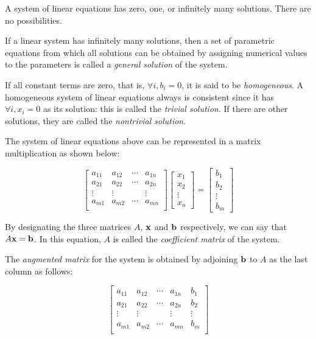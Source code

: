 \documentclass{report}
\begin{document}
		\begin{thm}
			A system of linear equations has zero, one, or infinitely many solutions. There are no possibilities.
		\end{thm}
		
		If a linear system has infinitely many solutions, then a set of parametric equations from which all solutions can be obtained by assigning numerical values to the parameters is called a \emph{general solution} of the system.
		
		If all constant terms are zero, that is, $\forall i, b_i=0$, it is said to be \emph{homogeneous}. A homogeneous system of linear equations always is consistent since it has $\forall i, x_i=0$ as its solution: this is called the \emph{trivial solution}. If there are other solutions, they are called the \emph{nontrivial solution}.
		
		The system of linear equations above can be represented in a matrix multiplication as shown below:
		
		\begin{displaymath}
			\begin{bmatrix}
				a_{11} & a_{12} & \cdots & a_{1n} \\
				a_{21} & a_{22} & \cdots & a_{2n} \\
				\vdots & \vdots &        & \vdots \\
				a_{m1} & a_{m2} & \cdots & a_{mn} \\
			\end{bmatrix}
			\begin{bmatrix}
				x_1 \\ x_2 \\ \vdots \\ x_n
			\end{bmatrix}
			=
			\begin{bmatrix}
				b_1 \\ b_2 \\ \vdots \\ b_m
			\end{bmatrix}
		\end{displaymath}
		
		By designating the three matrices $A$, $\bf{x}$ and $\bf{b}$ respectively, we can say that $A\bf{x}=\bf{b}$. In this equation, $A$ is called the \emph{coefficient matrix} of the system.
		
		The \emph{augmented matrix} for the system is obtained by adjoining $\bf{b}$ to $A$ as the last column as follows:
		
		\begin{displaymath}
			\left[\begin{array}{cccc|c}
				a_{11} & a_{12} & \cdots & a_{1n} & b_1\\
				a_{21} & a_{22} & \cdots & a_{2n} & b_2\\
				\vdots & \vdots &        & \vdots & \vdots\\
				a_{m1} & a_{m2} & \cdots & a_{mn} & b_m\\
			\end{array}\right]
		\end{displaymath}
		
\end{document}
